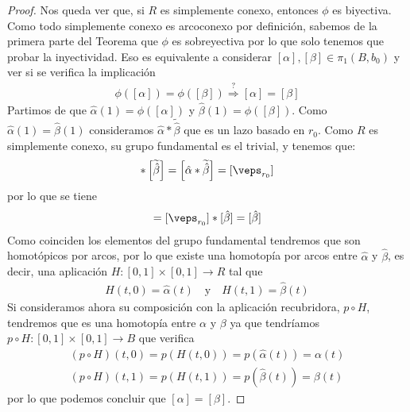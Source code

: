 \begin{teo}
\begin{proof}
        Nos queda ver que, si $R$ es simplemente conexo, entonces $\phi$ es biyectiva. Como todo simplemente conexo es arcoconexo por definición, sabemos de la primera parte del Teorema que $\phi$ es sobreyectiva por lo que solo tenemos que probar la inyectividad. Eso es equivalente a considerar $[\alpha],[\beta]\in \pi_1(B,b_0)$ y ver si se verifica la implicación
        \begin{gather*}
             \phi([\alpha]) = \phi([\beta]) \overset{?}{\Longrightarrow} [\alpha]=[\beta]
        \end{gather*}
        Partimos de que $\hat{\alpha}(1) = \phi([\alpha])$ y $\hat{\beta}(1) = \phi([\beta])$. Como $\hat{\alpha}(1)=\hat{\beta}(1)$ consideramos $\hat{\alpha} \ast \tilde{\hat{\beta}}$ que es un lazo basado en $r_0$. Como $R$ es simplemente conexo, su grupo fundamental es el trivial, y tenemos que:
        \begin{gather*}
            [\hat{\alpha}] \ast \left[\tilde{\hat{\beta}}\right]  = \left[ \hat{\alpha} \ast \tilde{\hat{\beta}} \right] = [\veps_{r_0}]
        \end{gather*}
        por lo que se tiene 
        \begin{gather*}
            [\hat{\alpha}] = [\veps_{r_0}] \ast [\hat{\beta}] = [\hat{\beta}]
        \end{gather*}
        Como coinciden los elementos del grupo fundamental tendremos que son homotópicos por arcos, por lo que existe una homotopía por arcos entre $\hat{\alpha}$ y $\hat{\beta}$, es decir, una aplicación $H:[0,1]\times [0,1] \to R$ tal que 
        \begin{gather*}
            H(t,0) = \hat{\alpha}(t) \ \ \ \text{ y } \ \ \ H(t, 1) = \hat{\beta}(t)
        \end{gather*}
        Si consideramos ahora su composición con la aplicación recubridora, $p\circ H$, tendremos que es una homotopía entre $\alpha$ y $\beta$ ya que tendríamos $p\circ H : [0,1] \times [0,1] \to B$ que verifica
        \begin{gather*}
            (p\circ H)(t,0) = p(H(t,0)) = p(\hat{\alpha}(t)) = \alpha(t)\\
            (p\circ H)(t,1) = p(H(t,1)) = p(\hat{\beta}(t)) = \beta(t)
        \end{gather*}
        por lo que podemos concluir que $[\alpha] = [\beta]$.
    \end{proof}
\end{teo}

